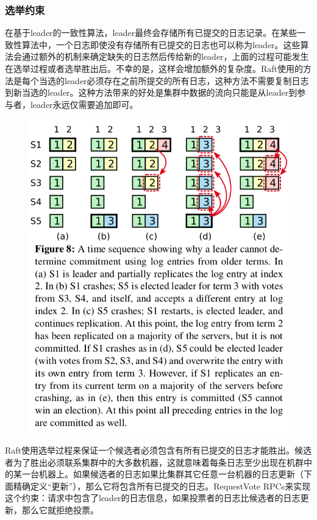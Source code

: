 \documentclass[journal]{IEEEtran}
\begin{document}
\subsubsection{选举约束}
在基于leader的一致性算法，leader最终会存储所有已提交的日志记录。在某些一致性算法中，一个日志即使没有存储所有已提交的日志也可以称为leader。这些算法会通过额外的机制来确定缺失的日志然后传给新的leader，上面的过程可能发生在选举过程或者选举胜出后。不幸的是，这样会增加额外的复杂度。Raft使用的方法是每个当选的leader必须存在之前所提交的所有日志，这种方法不需要复制日志到新当选的leader。这种方法带来的好处是集群中数据的流向只能是从leader到参与者，leader永远仅需要追加即可。

\begin{figure}[htbp]
\begin{center}
\includegraphics[width=1\linewidth]{./fig8.png}
\end{center}
\end{figure}

Raft使用选举过程来保证一个候选者必须包含有所有已提交的日志才能胜出。候选者为了胜出必须联系集群中的大多数机器，这就意味着每条日志至少出现在机群中的某一台机器上。如果候选者的日志如果比集群其它任意一台机器的日志更新（下面精确定义“更新”），那么它将包含所有已提交的日志。RequestVote RPCs来实现这个约束：请求中包含了leader的日志信息，如果投票者的日志比候选者的日志更新，那么它就拒绝投票。
\end{document}
